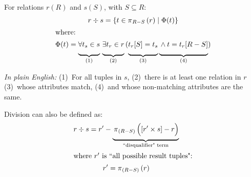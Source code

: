 \begin{multicols}{2}
\begin{CheatsheetEntryFrame}
    \end{CheatsheetEntryFrame}

    \begin{CheatsheetEntryFrame}


        For relations $r(R)$ and $s(S)$, with $S \subseteq R$:
        \newcommand{\X}{\rule[-2ex]{0mm}{2ex}}
        \begin{gather*}
            r \div s = \setdef{t \in \relproject_{R-S}{(r)}}{\Phi(t)} \\
            \intertext{where:}
            \Phi(t) =
                \underbrace{\X \forall t_s \in s}_{(1)}
                \, \underbrace{\X \exists t_r \in r}_{(2)}
                \, (
                    \underbrace{\X t_r[S] = t_s}_{(3)}
                    \underbrace{\X \wedge t = t_r[R-S]}_{(4)}
                )
        \end{gather*}

        \textit{In plain English:} (1)~For all tuples in $s$, (2)~there is at least one relation in $r$ (3)~whose attributes match, (4)~and whose non-matching attributes are the same.

        \vspace{\TextExtraSkip}%
        Division can also be defined as:
        \begin{gather*}
            r \div s =
                r' -
                \underbrace{ \rule[-2ex]{0mm}{2ex}
                    \relproject_{(R-S)}{\parens*{\vphantom{\frac{x}{x}} [r' \times s] - r}}
                }_{\text{``disqualifier" term}}
                \\
            \intertext{where $r'$ is ``all possible result tuples":}
            r' = \relproject_{(R-S)}{(r)}
        \end{gather*}


\end{CheatsheetEntryFrame}
\end{multicols}
